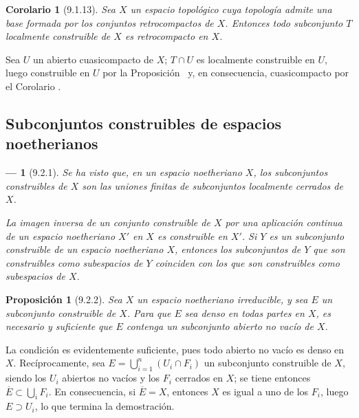 \documentclass[10pt,oneside,openany]{book}
\theoremstyle{egaenv}\newtheorem*{env}{---}
\theoremstyle{egastatement}
\newtheorem*{proposition}{Proposición}
\newtheorem*{corollary}{Corolario}
\theoremstyle{egadescription}
\newcommand{\oldpage}[2][]{\marginnote{\normalfont\scriptsize\textbf{#1}\,|\,#2}\ignorespaces}
\begin{document}
\begin{corollary}[9.1.13]
\label{0.9.1.13}
\label{0.9.1.13-fr}
Sea $X$ un espacio topológico cuya topología admite una base formada por los conjuntos retrocompactos de $X$.
Entonces todo subconjunto $T$ localmente construible de $X$ es retrocompacto en $X$.
\end{corollary}


Sea $U$ un abierto cuasicompacto de $X$; $T\cap U$ es localmente construible en $U$, luego construible en $U$ por la Proposición~ y, en consecuencia, cuasicompacto por el Corolario .


\subsection{Subconjuntos construibles de espacios noetherianos}
\label{subsection:0.9.2}
\label{subsection:0.9.2-fr}

\begin{env}[9.2.1]
\label{0.9.2.1}
\label{0.9.2.1-fr}
Se ha visto  que, en un espacio noetheriano $X$, los subconjuntos construibles de $X$ son las \emph{uniones finitas de subconjuntos localmente cerrados} de $X$.

La imagen inversa de un conjunto construible de $X$ por una aplicación continua de un espacio noetheriano $X'$ en $X$ es construible en $X'$.
Si $Y$ es un subconjunto construible de un espacio noetheriano $X$, entonces los subconjuntos de $Y$ que son construibles como subespacios de $Y$ coinciden con los que son construibles como subespacios de $X$.
\end{env}

\begin{proposition}[9.2.2]
\label{0.9.2.2}
\label{0.9.2.2-fr}
Sea $X$ un espacio noetheriano irreducible, y sea $E$ un subconjunto construible de $X$.
Para que $E$ sea denso en todas partes en $X$, es necesario y suficiente que $E$ contenga un subconjunto abierto no vacío de $X$.
\end{proposition}


\oldpage[0\textsubscript{III}]{15}
La condición es evidentemente suficiente, pues todo abierto no vacío es denso en $X$.
Recíprocamente, sea $E=\bigcup_{i=1}^n(U_i\cap F_i)$ un subconjunto construible de $X$, siendo los $U_i$ abiertos no vacíos y los $F_i$ cerrados en $X$; se tiene entonces $\overline{E}\subset\bigcup_i F_i$.
En consecuencia, si $\overline{E}=X$, entonces $X$ es igual a uno de los $F_i$, luego $E\supset U_i$, lo que termina la demostración.
\end{document}
